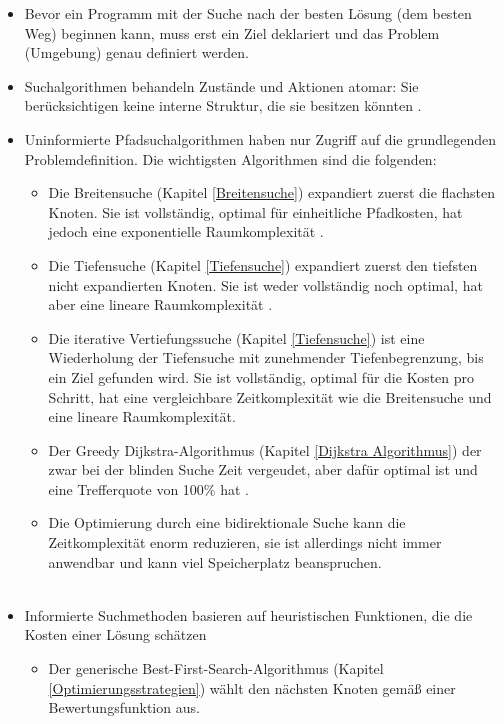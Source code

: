 \begin{itemize}
    \item Bevor ein Programm mit der Suche nach der besten Lösung (dem besten Weg) beginnen kann, muss erst ein Ziel deklariert und das Problem (Umgebung) genau definiert werden.
    \item Suchalgorithmen behandeln Zustände und Aktionen atomar: Sie berücksichtigen keine interne Struktur, die sie besitzen könnten \cite[108,109]{Russell:10}.
    \item Uninformierte Pfadsuchalgorithmen haben nur Zugriff auf die grundlegenden Problemdefinition. Die wichtigsten Algorithmen sind die folgenden:
    \begin{itemize}
        \item Die Breitensuche (Kapitel \ref{Breitensuche}) expandiert zuerst die flachsten Knoten. Sie ist vollständig, optimal für einheitliche Pfadkosten, hat jedoch eine exponentielle Raumkomplexität \cite[81]{Russell:10}.
        \item Die Tiefensuche (Kapitel \ref{Tiefensuche}) expandiert zuerst den tiefsten nicht expandierten Knoten. Sie ist weder vollständig noch optimal, hat aber eine lineare Raumkomplexität \cite[85,86]{Russell:10}.
        \item Die iterative Vertiefungssuche (Kapitel \ref{Tiefensuche}) ist eine Wiederholung der Tiefensuche mit zunehmender Tiefenbegrenzung, bis ein Ziel gefunden wird. Sie ist vollständig, optimal für die Kosten pro Schritt, hat eine vergleichbare Zeitkomplexität wie die Breitensuche und eine lineare Raumkomplexität\cite[85,86]{Russell:10}.
        \item Der Greedy Dijkstra-Algorithmus (Kapitel \ref{Dijkstra Algorithmus}) der zwar bei der blinden Suche Zeit vergeudet, aber dafür optimal ist und eine Trefferquote von 100\% hat \cite{Karur:21}.
        \item Die Optimierung durch eine bidirektionale Suche kann die Zeitkomplexität enorm reduzieren, sie ist allerdings nicht immer anwendbar und kann viel Speicherplatz beanspruchen.\\\\
    \end{itemize}
    \item Informierte Suchmethoden basieren auf heuristischen Funktionen, die die Kosten einer Lösung schätzen
    \begin{itemize}
        \item Der generische Best-First-Search-Algorithmus (Kapitel \ref{Optimierungsstrategien}) wählt den nächsten Knoten gemäß einer Bewertungsfunktion aus.

\end{itemize}
\end{itemize}
